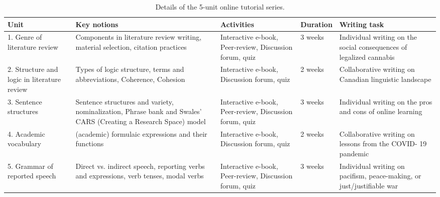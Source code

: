\begin{table*}[]
    \centering
    \scriptsize
    
    \begin{tabular}{p{2cm}|p{3.5cm}|p{3cm}|p{1.5cm}|p{3.5cm}}
    \toprule
      \textbf{Unit}  & \textbf{Key notions} & \textbf{Activities} & \textbf{Duration} & \textbf{Writing task} \\ \midrule
      1. Genre of literature review   & Components in literature review writing, material selection, citation practices & Interactive e-book, Peer-review, Discussion forum, quiz & 3 weeks & Individual writing on the social consequences of legalized cannabis \\ \midrule

      2. Structure and logic in literature review  & Types of logic structure, terms and abbreviations, Coherence, Cohesion & Interactive e-book, Discussion forum, quiz & 2 weeks & Collaborative writing on Canadian linguistic landscape \\ \midrule

      3. Sentence structures  & Sentence structures and variety, nominalization, Phrase bank and Swales’ CARS (Creating a Research Space) model & Interactive e-book, Peer-review, Discussion forum, quiz & 3 weeks & Individual writing on the pros and cons of online learning \\ \midrule

      4. Academic vocabulary  & (academic) formulaic expressions and their functions & Interactive e-book, Discussion forum, quiz & 2 weeks & Collaborative writing on lessons from the COVID- 19 pandemic \\ \midrule

      5. Grammar of reported speech   & Direct vs. indirect speech, reporting verbs and expressions, verb tenses, modal verbs & Interactive e-book, Peer-review, Discussion forum, quiz & 3 weeks & Individual writing on pacifism, peace-making, or just/justifiable war \\ \bottomrule
      
    \end{tabular}
    \caption{Details of the 5-unit online tutorial series.}
    \label{tab:details-of-the-5-unit-tutorial-series}
\end{table*}
